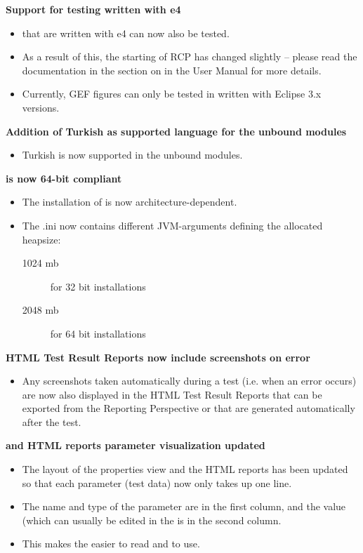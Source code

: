 \textbf{Support for testing \gdauts{} written with e4}
\begin{itemize}
\item \gdauts{} that are written with e4 can now also be tested.  
\item As a result of this, the starting of RCP \gdauts{} has changed slightly -- please read the documentation in the section on  in the User Manual for more details. 
\item Currently, GEF figures can only be tested in \gdauts{} written with Eclipse 3.x versions. 
\end{itemize}

\textbf{Addition of Turkish as supported language for the unbound modules}
\begin{itemize}
\item Turkish is now supported in the unbound modules.
\end{itemize}

\textbf{\app{} is now 64-bit compliant}
\begin{itemize}
\item The installation of \app{} is now architecture-dependent.
\item The \app{}.ini now contains different JVM-arguments defining the allocated heapsize:
\begin{description}
\item [1024 mb]{for 32 bit installations}
\item [2048 mb]{for 64 bit installations}
\end{description}
\end{itemize}

\textbf{HTML Test Result Reports now include screenshots on error}
\begin{itemize}
\item Any screenshots taken automatically during a test (i.e. when an error occurs) are now also displayed in the HTML Test Result Reports that can be exported from the Reporting Perspective or that are generated automatically after the test. 
\end{itemize}

\textbf{\gdpropview{} and HTML reports parameter visualization updated}\\
\begin{itemize}
\item The layout of the properties view and the HTML reports has been updated so that each parameter (test data) now only takes up one line. 
\item The name and type of the parameter are in the first column, and the value (which can usually be edited in the \gdpropview{} is in the second column.
\item This makes the \gdpropview{} easier to read and to use. 
\end{itemize}

